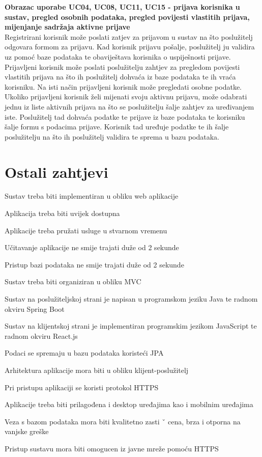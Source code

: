 				\textbf{Obrazac uporabe UC04, UC08, UC11, UC15 - prijava korisnika u sustav, pregled osobnih podataka, pregled povijesti vlastitih prijava, mijenjanje sadržaja aktivne prijave}\\
				Registrirani korisnik može poslati zatjev za prijavom u sustav na što poslužitelj odgovara formom za prijavu. Kad korisnik prijavu pošalje, poslužitelj ju validira uz pomoć baze podataka te obaviještava korisnika o uspiješnosti prijave. Prijavljeni korisnik može poslati poslužitelju zahtjev za pregledom povijesti vlastitih prijava na što ih poslužitelj dohvaća iz baze podataka te ih vraća korisniku. Na isti način prijavljeni korisnik može pregledati osobne podatke.
				Ukoliko prijavljeni korisnik želi mijenati svoju aktivnu prijavu, može odabrati jednu iz liste aktivnih prijava na što se poslužitelju šalje zahtjev za uređivanjem iste. Poslužitelj tad dohvaća podatke te prijave iz baze podataka te korisniku šalje formu s podacima prijave. Korisnik tad uređuje podatke te ih šalje poslužitelju na što ih poslužitelj validira te sprema u bazu podataka.

				\eject
	
		\section{Ostali zahtjevi}
		
			\begin{packed_item}
			\item Sustav treba biti implementiran u obliku web aplikacije
			\item Aplikacija treba biti uvijek dostupna
			\item Aplikacije treba pružati usluge u stvarnom vremenu
			\item Učitavanje aplikacije ne smije trajati duže od 2 sekunde
			\item Pristup bazi podataka ne smije trajati duže od 2 sekunde
			\item Sustav treba biti organiziran u obliku MVC
			\item Sustav na poslužiteljskoj strani je napisan u programskom jeziku Java te radnom okviru Spring Boot
			\item Sustav na klijentskoj strani je implementiran programskim jezikom JavaScript te radnom okviru React.js
			\item Podaci se spremaju u bazu podataka koristeći JPA
			\item Arhitektura aplikacije mora biti u obliku klijent-poslužitelj
			\item Pri pristupu aplikaciji se koristi protokol HTTPS
			\item Aplikacije treba biti prilagođena i desktop uređajima kao i mobilnim uređajima
			\item Veza s bazom podataka mora biti kvalitetno zasti ˇ cena, brza i otporna na vanjske greške
			\item Pristup sustavu mora biti omogucen iz javne mreže pomoću HTTPS
			\end{packed_item}
			 